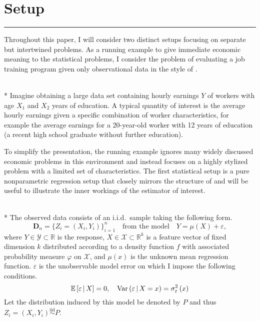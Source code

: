 \section{Setup}\label{sec:setup}
\hrule
Throughout this paper, I will consider two distinct setups focusing on separate but intertwined problems.
As a running example to give immediate economic meaning to the statistical problems, I consider the problem of evaluating a job training program given only observational data in the style of \citet{lalonde_evaluating_1986}.
\begin{boxE}
	\begin{exmp}\label{asm:run_exmp}\mbox{}\\*
        Imagine obtaining a large data set containing hourly earnings $Y$ of workers with age $X_1$ and $X_2$ years of education.
        A typical quantity of interest is the average hourly earnings given a specific combination of worker characteristics, for example the average earnings for a 20-year-old worker with 12 years of education (a recent high school graduate without further education).
	\end{exmp}
\end{boxE}
To simplify the presentation, the running example ignores many widely discussed economic problems in this environment and instead focuses on a highly stylized problem with a limited set of characteristics.
The first statistical setup is a pure nonparametric regression setup that closely mirrors the structure of \citet{demirkaya_optimal_2024} and will be useful to illustrate the inner workings of the estimator of interest.
\begin{boxD}
	\begin{asm}\label{asm:npr_dgp}\mbox{}\\*
		The observed data consists of an i.i.d.\ sample taking the following form.
		\begin{equation}\label{DGP1}
			\mathbf{D}_n = \{Z_{i} = (X_{i}, Y_{i})\}_{i = 1}^{n}
			\quad \text{from the model} \quad
			Y = \mu(X) + \varepsilon,
		\end{equation}
		where $Y \in \mathcal{Y} \subset \mathbb{R}$ is the response, $X \in \mathcal{X} \subset \mathbb{R}^k$ is a feature vector of fixed dimension $k$ distributed according to a density function $f$ with associated probability measure $\varphi$ on $\mathcal{X}$, and $\mu(x)$ is the unknown mean regression function.
		$\varepsilon$ is the unobservable model error on which I impose the following conditions.
		\begin{equation}
			\mathbb{E}\left[\varepsilon \, \middle| \, X\right] = 0, \quad
			\text{Var}\left(\varepsilon \, \middle| \, X = x\right) = \sigma_{\varepsilon}^2\left(x\right)
		\end{equation}
		Let the distribution induced by this model be denoted by $P$ and thus $Z_{i} = \left(X_{i}, Y_{i}\right) \overset{\text{iid}}{\sim} P$.
	\end{asm}
\end{boxD}
